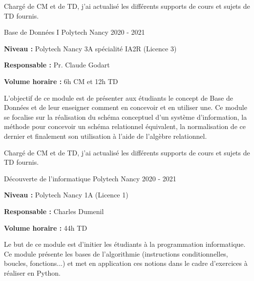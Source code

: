 \documentclass[12pt, a4paper]{awesome-cv}
\begin{document}
\begin{cventries}
  \begin{cvparagraph}
    Chargé de CM et de TD, j'ai actualisé les différents supports de cours et sujets de TD fournis.
  \end{cvparagraph}

  \cventry
  {Base de Données I}
  {Polytech Nancy}
  {}
  {2020 - 2021}
  {
    \begin{cvitems}
      \item {\textbf{Niveau : } Polytech Nancy 3A spécialité IA2R (Licence 3)}
      \item {\textbf{Responsable : } Pr. Claude Godart}
      \item {\textbf{Volume horaire : } 6h CM et 12h TD}
    \end{cvitems}
  }

  \begin{cvparagraph}
    L'objectif de ce module est de présenter aux étudiants le concept de Base de Données et de leur enseigner comment en concevoir et en utiliser une. Ce module se focalise sur la réalisation du schéma conceptuel d'un système d'information, la méthode pour concevoir un schéma relationnel équivalent, la normalisation de ce dernier et finalement son utilisation à l'aide de l'algèbre relationnel.
  \end{cvparagraph}

  \begin{cvparagraph}
    Chargé de CM et de TD, j'ai actualisé les différents supports de cours et sujets de TD fournis.
  \end{cvparagraph}

  \cventry
  {Découverte de l'informatique}
  {Polytech Nancy}
  {}
  {2020 - 2021}
  {
    \begin{cvitems}
      \item {\textbf{Niveau : } Polytech Nancy 1A (Licence 1)}
      \item {\textbf{Responsable : } Charles Dumenil}
      \item {\textbf{Volume horaire : } 44h TD}
    \end{cvitems}
  }

  \begin{cvparagraph}
    Le but de ce module est d'initier les étudiants à la programmation informatique. Ce module présente les bases de l'algorithmie (instructions conditionnelles, boucles, fonctions...) et met en application ces notions dans le cadre d'exercices à réaliser en Python.
  \end{cvparagraph}


\end{cventries}
\end{document}
